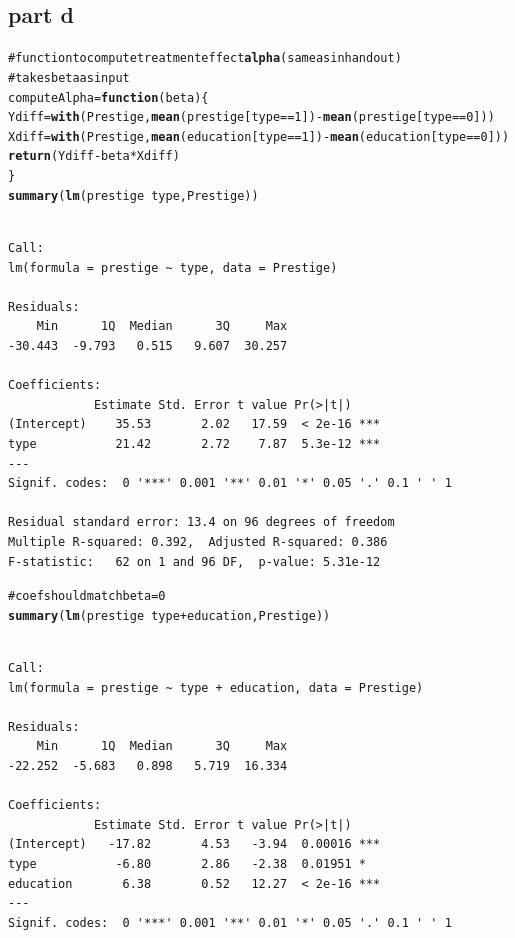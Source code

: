 \documentclass{article}\usepackage{graphicx, color}
\makeatletter
\newcommand{\hlfunctioncall}[1]{\textcolor[rgb]{0.501960784313725,0,0.329411764705882}{\textbf{#1}}}%
\newcommand{\hlcomment}[1]{\textcolor[rgb]{0.180392156862745,0.6,0.341176470588235}{#1}}%
\newenvironment{kframe}{%
 \def\at@end@of@kframe{}%
 \ifinner\ifhmode%
  \def\at@end@of@kframe{\end{minipage}}%
  \begin{minipage}{\columnwidth}%
 \fi\fi%
 \def\FrameCommand##1{\hskip\@totalleftmargin \hskip-\fboxsep
 \colorbox{shadecolor}{##1}\hskip-\fboxsep
     \hskip-\linewidth \hskip-\@totalleftmargin \hskip\columnwidth}%
 \MakeFramed {\advance\hsize-\width
   \@totalleftmargin\z@ \linewidth\hsize
   \@setminipage}}%
 {\par\unskip\endMakeFramed%
 \at@end@of@kframe}
\newenvironment{knitrout}{}{} %
\makeatother
\begin{document}
\subsection*{part d}
\begin{knitrout}
\color{fgcolor}\begin{kframe}
\begin{alltt}
\hlcomment{# function to compute treatment effect \hlfunctioncall{alpha} (same as in handout)}
\hlcomment{# takes beta as input}
computeAlpha=\hlfunctioncall{function}(beta)\{
    Ydiff=\hlfunctioncall{with}(Prestige, \hlfunctioncall{mean}(prestige[type==1])-\hlfunctioncall{mean}(prestige[type==0]))
    Xdiff=\hlfunctioncall{with}(Prestige, \hlfunctioncall{mean}(education[type==1])-\hlfunctioncall{mean}(education[type==0]))
    \hlfunctioncall{return}(Ydiff-beta*Xdiff)    
\}
\hlfunctioncall{summary}(\hlfunctioncall{lm}(prestige~type, Prestige))
\end{alltt}
\begin{verbatim}

Call:
lm(formula = prestige ~ type, data = Prestige)

Residuals:
    Min      1Q  Median      3Q     Max 
-30.443  -9.793   0.515   9.607  30.257 

Coefficients:
            Estimate Std. Error t value Pr(>|t|)    
(Intercept)    35.53       2.02   17.59  < 2e-16 ***
type           21.42       2.72    7.87  5.3e-12 ***
---
Signif. codes:  0 '***' 0.001 '**' 0.01 '*' 0.05 '.' 0.1 ' ' 1 

Residual standard error: 13.4 on 96 degrees of freedom
Multiple R-squared: 0.392,	Adjusted R-squared: 0.386 
F-statistic:   62 on 1 and 96 DF,  p-value: 5.31e-12 

\end{verbatim}
\begin{alltt}
    \hlcomment{#coef should match beta=0}
\hlfunctioncall{summary}(\hlfunctioncall{lm}(prestige~type+education, Prestige))
\end{alltt}
\begin{verbatim}

Call:
lm(formula = prestige ~ type + education, data = Prestige)

Residuals:
    Min      1Q  Median      3Q     Max 
-22.252  -5.683   0.898   5.719  16.334 

Coefficients:
            Estimate Std. Error t value Pr(>|t|)    
(Intercept)   -17.82       4.53   -3.94  0.00016 ***
type           -6.80       2.86   -2.38  0.01951 *  
education       6.38       0.52   12.27  < 2e-16 ***
---
Signif. codes:  0 '***' 0.001 '**' 0.01 '*' 0.05 '.' 0.1 ' ' 1 


\end{verbatim}
\end{kframe}
\end{knitrout}
\end{document}
